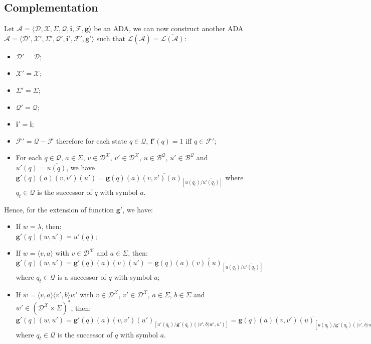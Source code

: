 \documentclass[a4paper, 11pt]{article}
\begin{document}
	\subsection{Complementation}
	
	Let $\mathcal{A} = \langle \mathcal{D}, \mathcal{X}, \Sigma, \mathcal{Q}, \bm{i}, \mathcal{F}, \bm{g} \rangle$ be an ADA, we can now construct another ADA $\mathcal{\overline{A}} = \langle \mathcal{D}', \mathcal{X}', \Sigma', \mathcal{Q}', \bm{i}', \mathcal{F}', \bm{g}' \rangle$ such that $\mathcal{L}(\mathcal{\overline{A}}) = \overline{\mathcal{L}(\mathcal{A})}$:
	\begin{itemize}
		\item $\mathcal{D}' = \mathcal{D}$;
		\item $\mathcal{X}' = \mathcal{X}$;
		\item $\Sigma' = \Sigma$;
		\item $\mathcal{Q}' = \mathcal{Q}$;
		\item $\bm{i}' = \bm{i}$;
		\item $\mathcal{F}' = \mathcal{Q} - \mathcal{F}$ therefore for each state $q \in \mathcal{Q}$, $\bm{f}'(q) = 1$ iff $q \in \mathcal{F}'$;
		\item For each $q \in \mathcal{Q}$, $a \in \Sigma$, $v \in \mathcal{D}^{\mathcal{X}}$, $v' \in \mathcal{D}^{\mathcal{X}}$, $u \in \mathcal{B}^{\mathcal{Q}}$, $u' \in \mathcal{B}^{\mathcal{Q}}$ and $u'(q) = \overline{u(q)}$, we have $\bm{g}'(q)(a)(v, v')(u') = \overline{\bm{g}(q)(a)(v, v')(u)_{[u(q_t) / \overline{u'(q_t)}]}}$ where $q_t \in \mathcal{Q}$ is the successor of $q$ with symbol $a$.
		\end{itemize}
		
		Hence, for the extension of function $\bm{g}'$, we have:
		\begin{itemize}
			\item If $w = \lambda$, then:\\
			$\bm{g}'(q)(w, u') = u'(q)$;
			\item If $w = \langle v, a \rangle$ with $v \in \mathcal{D}^{\mathcal{X}}$ and $a \in \Sigma$, then:\\
			$\bm{g}'(q)(w, u') = \bm{g}'(q)(a)(v)(u') = \overline{\bm{g}(q)(a)(v)(u)_{[u(q_t) / \overline{u'(q_t)}]}}$ where $q_t \in \mathcal{Q}$ is a successor of $q$ with symbol $a$;
			\item If $w = \langle v, a \rangle \langle v', b \rangle w'$ with $v \in \mathcal{D}^{\mathcal{X}}$, $v' \in \mathcal{D}^{\mathcal{X}}$, $a \in \Sigma$, $b \in \Sigma$ and $w' \in (\mathcal{D}^{\mathcal{X}} \times \Sigma)^*$, then:\\
			$\bm{g}'(q)(w, u') = \bm{g}'(q)(a)(v, v')(u')_{[u'(q_t) / \bm{g}'(q_t)(\langle v', b \rangle w', u')]} = \overline{\bm{g}(q)(a)(v, v')(u)_{[u(q_t) / \overline{\bm{g}'(q_t)(\langle v', b \rangle w', u')}]}}$ where $q_t \in \mathcal{Q}$ is the successor of $q$ with symbol $a$.
		\end{itemize}
		
\end{document}
